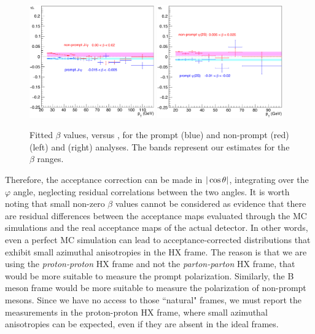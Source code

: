 \begin{figure}[h]
\centering
\includegraphics[width=0.48\textwidth]{Figures/chapter6/beta-jpsi.pdf}
\includegraphics[width=0.48\textwidth]{Figures/chapter6/beta-psip.pdf}
\caption{Fitted $\beta$ values, versus \pt, 
for the prompt (blue) and non-prompt (red) \jpsi (left) and \psip (right) analyses.
The bands represent our estimates for the $\beta$ ranges.}
\label{fig:beta}
\end{figure}

Therefore, the acceptance correction can be made in $|\cos\theta|$,
integrating over the $\varphi$ angle, 
neglecting residual correlations between the two angles.
%
It is worth noting that small non-zero $\beta$ values 
cannot be considered as evidence that there are residual differences 
between the acceptance maps evaluated through the MC simulations
and the real acceptance maps of the actual detector.
In other words, even a perfect MC simulation can lead to 
acceptance-corrected distributions that exhibit small azimuthal anisotropies
in the HX frame.
The reason is that we are using the \emph{proton-proton} HX frame 
and not the \emph{parton-parton} HX frame, 
that would be more suitable to measure the prompt \jpsi polarization.
Similarly, the B meson frame would be more suitable 
to measure the polarization of non-prompt \jpsi mesons.
Since we have no access to those ``natural" frames, 
we must report the measurements in the proton-proton HX frame,
where small azimuthal anisotropies can be expected,
even if they are absent in the ideal frames.

